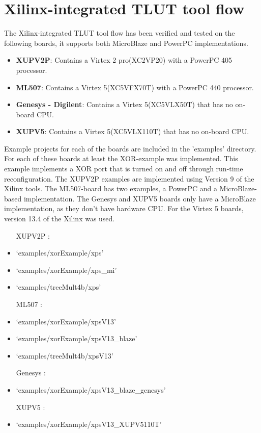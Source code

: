 \documentclass[a4paper,oneside]{memoir}
\begin{document}
\clearpage
\chapter{Xilinx-integrated TLUT tool flow}\label{sec:xilinx_flow}

The Xilinx-integrated TLUT tool flow has been verified and tested on the following boards, it supports both MicroBlaze and PowerPC implementations.
\begin{itemize}
	\item \textbf{XUPV2P}: Contains a Virtex 2 pro(XC2VP20) with a PowerPC 405 processor.
	\item \textbf{ML507}: Contains a Virtex 5(XC5VFX70T) with a PowerPC 440 processor.
	\item \textbf{Genesys - Digilent}: Contains a Virtex 5(XC5VLX50T) that has no on-board CPU.
        \item \textbf{XUPV5}: Contains a Virtex 5(XC5VLX110T) that has no on-board CPU.
\end{itemize}

Example projects for each of the boards are included in the 'examples' directory. For each of these boards at least the XOR-example was implemented. This example implements a XOR port that is turned on and off through run-time reconfiguration. The XUPV2P examples are implemented using Version 9 of the Xilinx tools. The ML507-board has two examples, a PowerPC and a MicroBlaze-based implementation. The Genesys and XUPV5 boards only have a MicroBlaze implementation, as they don't have hardware CPU. For the Virtex 5 boards, version 13.4 of the Xilinx was used.

\begin{itemize}
\item[XUPV2P :]
\item `examples/xorExample/xps'
\item `examples/xorExample/xps\_mi'
\item `examples/treeMult4b/xps'
\item[ML507 :]
\item `examples/xorExample/xpsV13'
\item `examples/xorExample/xpsV13\_blaze'
\item `examples/treeMult4b/xpsV13'
\item[Genesys :]
\item `examples/xorExample/xpsV13\_blaze\_genesys'
\item[XUPV5 :]
\item `examples/xorExample/xpsV13\_XUPV5110T'
\end{itemize}
\end{document}
